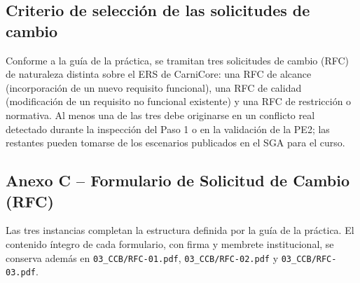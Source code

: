 \documentclass[11pt,a4paper]{article}
\begin{document}
\subsection{Criterio de selección de las solicitudes de cambio}
Conforme a la guía de la práctica, se tramitan tres solicitudes de cambio (RFC) de naturaleza distinta sobre el ERS de CarniCore: una RFC de alcance (incorporación de un nuevo requisito funcional), una RFC de calidad (modificación de un requisito no funcional existente) y una RFC de restricción o normativa. Al menos una de las tres debe originarse en un conflicto real detectado durante la inspección del Paso 1 o en la validación de la PE2; las restantes pueden tomarse de los escenarios publicados en el SGA para el curso.

\subsection{Anexo C -- Formulario de Solicitud de Cambio (RFC)}
Las tres instancias completan la estructura definida por la guía de la práctica. El contenido íntegro de cada formulario, con firma y membrete institucional, se conserva además en \texttt{03\_CCB/RFC-01.pdf}, \texttt{03\_CCB/RFC-02.pdf} y \texttt{03\_CCB/RFC-03.pdf}.
\end{document}
